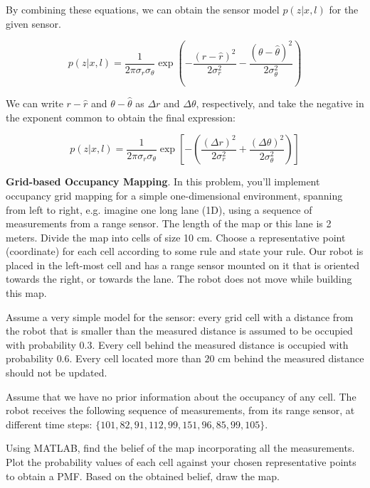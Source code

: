 \documentclass[answers]{exam}
\begin{document}
\begin{questions}
\begin{solution}
        By combining these equations, we can obtain the sensor model $p(z|x, l)$ for
        the given sensor.

        \[
            p(z | x, l) = \frac{1}{2\pi\sigma_r\sigma_\theta} \exp\left(-\frac{(r - \hat{r})^2}{2\sigma_r^2} - \frac{(\theta - \hat{\theta})^2}{2\sigma_\theta^2}\right)
        \]

        We can write $r - \hat{r}$ and $\theta - \hat{\theta}$ as $\Delta r$ and
        $\Delta \theta$, respectively, and take the negative in the exponent
        common to obtain the final expression:

        \[
            p(z | x, l) = \frac{1}{2\pi\sigma_r\sigma_\theta} \exp\left[- \left(\frac{(\Delta r)^2}{2\sigma_r^2} + \frac{(\Delta \theta)^2}{2\sigma_\theta^2}\right)\right]
        \]
    \end{solution}

    \question[25]
    \textbf{Grid-based Occupancy Mapping}. In this problem, you'll implement occupancy grid mapping
    for a simple one-dimensional environment, spanning from left to right, e.g. imagine one long
    lane (1D), using a sequence of measurements from a range sensor. The length of the map or
    this lane is 2 meters. Divide the map into cells of size 10 cm. Choose a representative point
    (coordinate) for each cell according to some rule and state your rule. Our robot is placed in
    the left-most cell and has a range sensor mounted on it that is oriented towards the right, or
    towards the lane. The robot does not move while building this map.

    Assume a very simple model for the sensor: every grid cell with a distance from
    the robot that is smaller than the measured distance is assumed to be occupied
    with probability $0.3$. Every cell behind the measured distance is occupied
    with probability $0.6$. Every cell located more than $20$ cm behind the
    measured distance should not be updated.

    Assume that we have no prior information about the occupancy of any cell. The
    robot receives the following sequence of measurements, from its range sensor,
    at different time steps: $\{101, 82, 91, 112, 99, 151, 96, 85, 99, 105\}$.

    Using MATLAB, find the belief of the map incorporating all the measurements.
    Plot the probability values of each cell against your chosen representative
    points to obtain a PMF. Based on the obtained belief, draw the map.


\end{questions}
\end{document}
